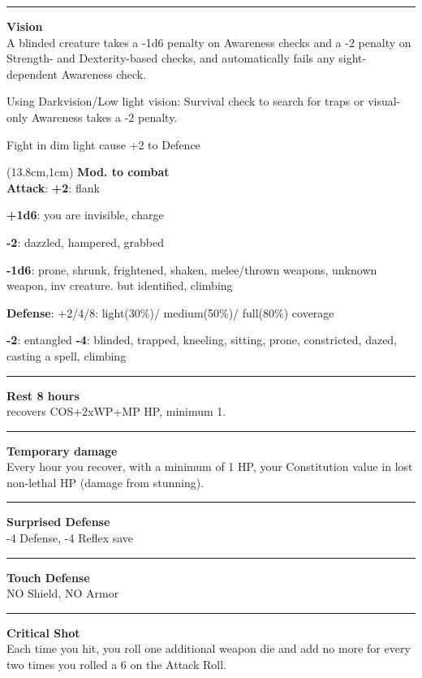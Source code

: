\documentclass[a4paper,12 pt,openany]{book}
\newcommand{\linex}{\rule{\textwidth}{0.4pt}}
\begin{document}
\begin{textblock*}{8.3cm}
\linex

\textbf{Vision}\\

A blinded creature  takes a -1d6 penalty on Awareness checks and a -2 penalty on Strength- and Dexterity-based checks, and automatically fails any sight-dependent Awareness check.

Using Darkvision/Low light vision: Survival check to search for traps or visual-only Awareness takes a -2 penalty.

Fight in dim light cause +2 to Defence


\end{textblock*}

\begin{textblock*}{6.2cm}(13.8cm,1cm) %
\textbf{Mod. to combat}\\
\textbf{Attack}:
\textbf{+2}: flank

\textbf{+1d6}: you are invisible, charge

\textbf{-2}: dazzled, hampered, grabbed

\textbf{-1d6}: prone, shrunk, frightened, shaken, melee/thrown weapons, unknown weapon, inv creature. but identified, climbing

\textbf{Defense}: +2/4/8: light(30\%)/ medium(50\%)/ full(80\%) coverage

\textbf{-2}: entangled \textbf{-4}: blinded, trapped, kneeling, sitting, prone, constricted, dazed, casting a spell, climbing
\linex

\textbf{Rest 8 hours} \\recovers COS+2xWP+MP HP, minimum 1.

\linex

\textbf{Temporary damage}\\ Every hour you recover, with a minimum of 1 HP, your Constitution value in lost non-lethal HP (damage from stunning).

\linex

\textbf{Surprised Defense}\\ -4 Defense, -4 Reflex save

\linex

\textbf{Touch Defense}\\ NO Shield, NO Armor

\linex

\textbf{Critical Shot}\\
Each time you hit, you roll one additional weapon die and add no more for every two times you rolled a 6 on the Attack Roll.


\end{textblock*}
\end{document}
